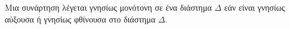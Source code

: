 Μια συνάρτηση λέγεται γνησίως μονότονη σε ένα διάστημα $ \varDelta $ εάν είναι γνησίως αύξουσα ή γνησίως φθίνουσα στο διάστημα $ \varDelta $.
